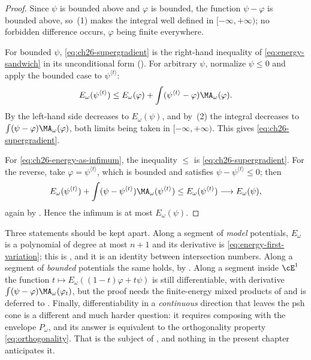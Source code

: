 \begin{proof}
Since \(\psi\) is bounded above and \(\varphi\) is bounded, the function
\(\psi-\varphi\) is bounded above, so
\,(1) makes the integral well defined in
\([-\infty,+\infty)\); no forbidden difference occurs, \(\varphi\) being
finite everywhere.

For bounded \(\psi\), \eqref{eq:ch26-supergradient} is the right-hand
inequality of \eqref{eq:energy-sandwich} in its unconditional form
().  For arbitrary \(\psi\), normalize
\(\psi\leq0\) and apply the bounded case to
\(\psi^{\langle t\rangle}\):
\[
 E_\omega(\psi^{\langle t\rangle})
 \leq E_\omega(\varphi)
   +\int(\psi^{\langle t\rangle}-\varphi)\MA_\omega(\varphi).
\]
By  the left-hand side decreases to
\(E_\omega(\psi)\), and by
\,(2) the integral decreases to
\(\int(\psi-\varphi)\MA_\omega(\varphi)\), both limits being taken in
\([-\infty,+\infty)\).  This gives \eqref{eq:ch26-supergradient}.

For \eqref{eq:ch26-energy-as-infimum}, the inequality \(\leq\) is
\eqref{eq:ch26-supergradient}.  For the reverse, take
\(\varphi=\psi^{\langle t\rangle}\), which is bounded and satisfies
\(\psi-\psi^{\langle t\rangle}\leq0\); then
\[
 E_\omega(\psi^{\langle t\rangle})
  +\int(\psi-\psi^{\langle t\rangle})
    \MA_\omega(\psi^{\langle t\rangle})
 \leq E_\omega(\psi^{\langle t\rangle})
 \longrightarrow E_\omega(\psi),
\]
again by .  Hence the infimum is at most
\(E_\omega(\psi)\).
\end{proof}

\begin{remark}
\label{rem:ch26-differentiability-scope}
Three statements should be kept apart.  Along a segment of \emph{model}
potentials, \(E_\omega\) is a polynomial of degree at most \(n+1\) and its
derivative is \eqref{eq:energy-first-variation}; this is
, and it is an identity between intersection
numbers.  Along a segment of \emph{bounded} potentials the same holds, by
.  Along a segment inside \(\cE^1\) the
function \(t\mapsto E_\omega((1-t)\varphi+t\psi)\) is still differentiable,
with derivative \(\int(\psi-\varphi)\MA_\omega(\varphi_t)\), but the proof
needs the finite-energy mixed products of
 and is deferred to
.  Finally, differentiability in a
\emph{continuous} direction that leaves the psh cone is a different and much
harder question: it requires composing with the envelope \(P_\omega\), and
its answer is equivalent to the orthogonality property
\eqref{eq:orthogonality}.  That is the subject of
, and nothing in the present chapter
anticipates it.
\end{remark}

